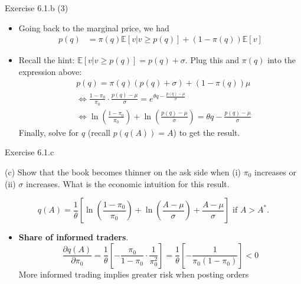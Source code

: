\documentclass[english,10pt
,aspectratio=169
]{beamer}
\begin{document}
\begin{frame}{Exercise 6.1.b (3)}
	\begin{itemize}
		\item Going back to the marginal price, we had
		\begin{align*}
			p(q) &= \pi(q) \mathbb{E}[v|v \ge p(q)]+(1-\pi(q))\mathbb{E}[v]
		\end{align*}
		\item Recall the hint: $\mathbb{E}[v|v \ge p(q)]=p(q)+\sigma$. Plug this and $\pi(q)$ into the expression above:
		\begin{align*}
			&p(q) = \pi(q) (p(q)+\sigma) + (1-\pi(q)) \mu 
			\\
			& \Leftrightarrow \frac{1-\pi_0}{\pi_0} \cdot \frac{p(q)-\mu}{\sigma} = e^{\theta q - \frac{p(q)-\mu}{\sigma}}  \\
			& \Leftrightarrow \ln \left( \frac{1-\pi_0}{\pi_0} \right) + \ln \left( \frac{p(q)-\mu}{\sigma} \right) = \theta q - \frac{p(q)-\mu}{\sigma} 
		\end{align*}
		Finally, solve for $q$ (recall $p(q(A))=A$) to get the result.
	\end{itemize}
\end{frame}


\begin{frame}{Exercise 6.1.c}
	\begin{exampleblock}{}
		(c) Show that the book becomes thinner on the ask side when (i) $\pi_0$ increases or (ii) $\sigma$ increases. What is the economic intuition for this result.
	\end{exampleblock}

	\pause
	$$
		q(A)=\frac{1}{\theta} \left[\ln \left(\frac{1-\pi_0}{\pi_0}\right) + \ln \left(\frac{A-\mu}{\sigma}\right) + \frac{A-\mu}{\sigma}\right]\text{ if } A>A^*.
	$$
	\begin{itemize}
		\item \textbf{Share of informed traders}. 
		\[
		\frac{\partial q(A)}{\partial \pi_0} = \frac{1}{\theta}\left[ -\frac{\pi_0}{1-\pi_0}\cdot \frac{1}{\pi_0^2}\right]=\frac{1}{\theta}\left[ -\frac{1}{\pi_0(1-\pi_0)}\right]<0
		\]
		More informed trading implies greater risk when posting orders
	\end{itemize}
\end{frame}
\end{document}
